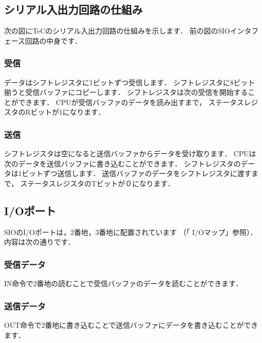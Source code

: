 \begin{center}
\end{center}

\subsection{シリアル入出力回路の仕組み}
次の図にTeCのシリアル入出力回路の仕組みを示します．
前の図のSIOインタフェース回路の中身です．

\subsubsection{受信}
データはシフトレジスタに1ビットずつ受信します．
シフトレジスタに8ビット揃うと受信バッファにコピーします．
シフトレジスタは次の受信を開始することができます．
CPUが受信バッファのデータを読み出すまで，
ステータスレジスタのRビットが1になります．

\subsubsection{送信}
シフトレジスタは空になると送信バッファからデータを受け取ります．
CPUは次のデータを送信バッファに書き込むことができます．
シフトレジスタのデータは1ビットずつ送信します．
送信バッファのデータをシフトレジスタに渡すまで，
ステータスレジスタのTビットが０になります．

\begin{center}
\end{center}

\subsection{I/Oポート}
\label{sioport}

SIOのI/Oポートは，2番地，3番地に配置されています
（「 I/Oマップ」参照）．
内容は次の通りです．

\subsubsection{受信データ}
IN命令で2番地の読むことで受信バッファのデータを読むことができます．

\subsubsection{送信データ}
OUT命令で2番地に書き込むことで送信バッファにデータを書き込むことができます．

